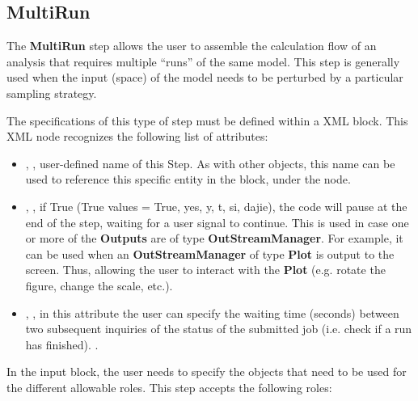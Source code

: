 \subsection{MultiRun}
\label{subsec:stepMultiRun}
The \textbf{MultiRun} step allows the user to assemble the calculation flow of
an analysis that requires multiple ``runs'' of the same model.
%
This step is generally used when the input (space) of the model needs to be
perturbed by a particular sampling strategy.
%

The specifications of this type of step must be defined within a
 XML block.
%
This XML node recognizes the following list of attributes:
\vspace{-5mm}
\begin{itemize}
\itemsep0em
\item {}, , user-defined name of
this Step. 
\nb As with other objects, this name can be used to reference this specific
entity in the  block, under the  node.
\item {}, , if True
(True values = True, yes, y, t, si, dajie), the code will pause at the end of
the step, waiting for a user signal to continue. This is used in case one or
more of the \textbf{Outputs} are of type \textbf{OutStreamManager}.
For example, it can be used when an \textbf{OutStreamManager} of type
\textbf{Plot} is output to the screen. Thus, allowing the user to interact with
the \textbf{Plot} (e.g. rotate the figure, change the scale, etc.).
\item {}, , in this attribute
the user can specify the waiting time (seconds) between two subsequent inquiries
of the status of the submitted job (i.e. check if a run has finished).
.
\end{itemize}
\vspace{-5mm}
In the  input block, the user needs to specify the objects
that need to be used for the different allowable roles.
%
This step accepts the following roles:
\vspace{-5mm}
